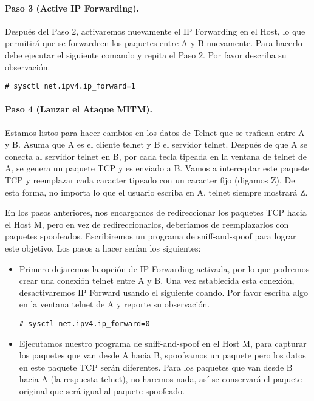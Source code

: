 \paragraph{Paso 3 (Active IP Forwarding).} Después del Paso 2, activaremos nuevamente el IP Forwarding en el Host, lo que permitirá que se forwardeen los paquetes entre A y B nuevamente. Para hacerlo debe ejecutar el siguiente comando y repita el Paso 2.
Por favor describa su observación.

\begin{lstlisting}
# sysctl net.ipv4.ip_forward=1
\end{lstlisting}

\paragraph{Paso 4 (Lanzar el Ataque MITM).} Estamos listos para hacer cambios en los datos de Telnet que se trafican entre A y B. Asuma que A es el cliente telnet y B el servidor telnet. Después de que A se conecta al servidor telnet en B, por cada tecla tipeada en la ventana de telnet de A, se genera un paquete TCP y es enviado a B. Vamos a interceptar este paquete TCP y reemplazar cada caracter tipeado con un caracter fijo (digamos Z). De esta forma, no importa lo que el usuario escriba en A, telnet siempre mostrará Z.

En los pasos anteriores, nos encargamos de redireccionar los paquetes TCP hacia el Host M, pero en vez de redireccionarlos, deberíamos de reemplazarlos con paquetes spoofeados. Escribiremos un programa de sniff-and-spoof para lograr este objetivo. 
Los pasos a hacer serían los siguientes:


\begin{itemize}

\item Primero dejaremos la opción de IP Forwarding activada, por lo que podremos crear una conexión telnet entre A y B. Una vez establecida esta conexión, desactivaremos IP Forward usando el siguiente coando. Por favor escriba algo en la ventana telnet de A y reporte su observación.

\begin{lstlisting}
# sysctl net.ipv4.ip_forward=0
\end{lstlisting}

\item Ejecutamos nuestro programa de sniff-and-spoof en el Host M, para capturar los paquetes que van desde A hacia B, spoofeamos un paquete pero los datos en este paquete TCP serán diferentes. Para los paquetes que van desde B hacia A (la respuesta telnet), no haremos nada, así se conservará el paquete original que será igual al paquete spoofeado.

\end{itemize} 

